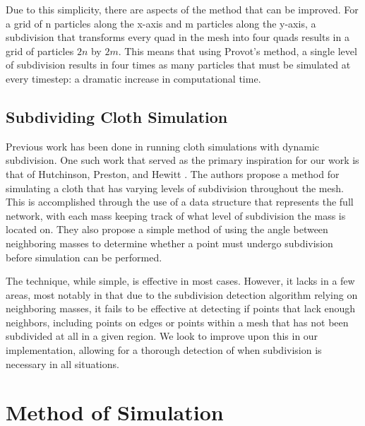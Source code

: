 \documentclass[sigconf]{acmart}
\begin{document}
Due to this simplicity, there are aspects of the method that can be improved. For a grid of n particles along the x-axis and m particles along the y-axis, a subdivision that transforms every quad in the mesh into four quads results in a grid of particles $2n$ by $2m$. This means that using Provot's method, a single level of subdivision results in four times as many particles that must be simulated at every timestep: a dramatic increase in computational time. 
\subsection{Subdividing Cloth Simulation}
Previous work has been done in running cloth simulations with dynamic subdivision. One such work that served as the primary inspiration for our work is that of Hutchinson, Preston, and Hewitt \cite{hutchinson}. The authors propose a method for simulating a cloth that has varying levels of subdivision throughout the mesh.
This is accomplished through the use of a data structure that represents the full network, with each mass keeping track of what level of subdivision the mass is located on. They also propose a simple method of using the angle between neighboring masses to determine whether a point must undergo subdivision before simulation can be performed.

The technique, while simple, is effective in most cases. However, it lacks in a few areas, most notably in that due to the subdivision detection algorithm relying on neighboring masses, it fails to be effective at detecting if points that lack enough neighbors, including points on edges or points within a mesh that has not been subdivided at all in a given region. We look to improve upon this in our implementation, allowing for a thorough detection of when subdivision is necessary in all situations.
\section{Method of Simulation}
\end{document}
